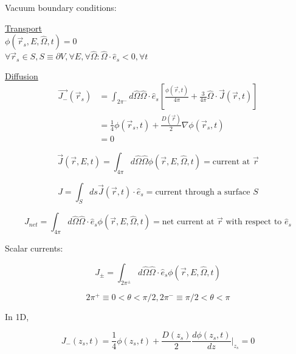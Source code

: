 \documentclass[12pt]{article}
\newcommand{\rvec}{\ensuremath{\vec{r}}}
\newcommand{\omvec}{\ensuremath{\hat{\Omega}}}
\begin{document}
Vacuum boundary conditions:

\begin{minipage}[t]{0.5\textwidth}
\underline{Transport} \\
$\phi(\rvec_s,E,\omvec,t) = 0$ \\
$\forall\rvec_s \in S, S \equiv \partial V, \forall E, \forall \omvec: \omvec\cdot\hat{e}_s<0, \forall t$
\end{minipage}
\begin{minipage}[t]{0.5\textwidth}
\underline{Diffusion} \\
\vspace{-10 mm}
\begin{align*}
\vec{J_-}(\rvec_s) &= \int_{2\pi^-}d\omvec\omvec\cdot\hat{e}_s
\left[\frac{\phi(\rvec,t)}{4\pi} + \frac{3}{4\pi}\omvec\cdot\vec{J}(\rvec,t)\right] \\
&= \frac{1}{4}\phi(\rvec_s,t) + \frac{D(\rvec)}{2}\nabla\phi(\rvec_s,t) \\
&= 0
\end{align*}
\end{minipage}

\begin{equation*}
\vec{J}(\rvec,E,t) = \int_{4\pi}d\omvec\omvec\phi(\rvec,E,\omvec,t) = \text{current at $\rvec$}
\end{equation*}

\begin{equation*}
J = \int_Sds\vec{J}(\rvec,t)\cdot\hat{e}_s = \text{current through a surface $S$}
\end{equation*}

\begin{equation*}
J_{net} = \int_{4\pi}d\omvec\omvec\cdot\hat{e}_s\phi(\rvec,E,\omvec,t) 
= \text{net current at $\rvec$ with respect to $\hat{e}_s$}
\end{equation*}

Scalar currents:

\begin{equation*}
J_{\pm} = \int_{2\pi^{\pm}}d\omvec\omvec\cdot\hat{e}_s\phi(\rvec,E,\omvec,t)
\end{equation*}

\begin{equation*}
2\pi^+ \equiv 0 < \theta < \pi/2, 2\pi^- \equiv \pi/2 < \theta < \pi
\end{equation*}

In 1D,

\begin{equation*}
J_-(z_s,t) = \frac{1}{4}\phi(z_s,t) + \frac{D(z_s)}{2}\frac{d\phi(z_s,t)}{dz}\Bigr|_{z_s} = 0
\end{equation*}
\end{document}
